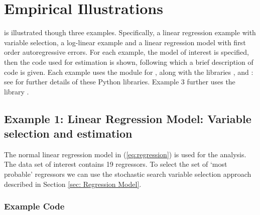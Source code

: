 \documentclass[article]{jss}
\begin{document}
\section{Empirical Illustrations}
\label{sec:Empirical-Illustrations}

 is illustrated though three examples. Specifically, a
linear regression example with variable selection, a log-linear
example and a linear regression model with first order autoregressive
errors.  For each example, the model of interest is specified, then
the code used for estimation is shown, following which a brief
description of code is given. Each example uses the module for
, along with the  libraries ,
 and : see \citet{NumpyScipy, Matplotlib}
for further details of these Python libraries.  Example 3 further uses
the library .


\subsection{Example 1: Linear Regression Model: Variable selection and estimation}

The normal linear regression model in (\ref{eq:regression}) is used
for the analysis.  The data set of interest contains 19 regressors. To
select the set of `most probable' regressors we can use the stochastic
search variable selection approach described in Section \ref{sec:
  Regression Model}.

\subsubsection{Example Code}
\end{document}
